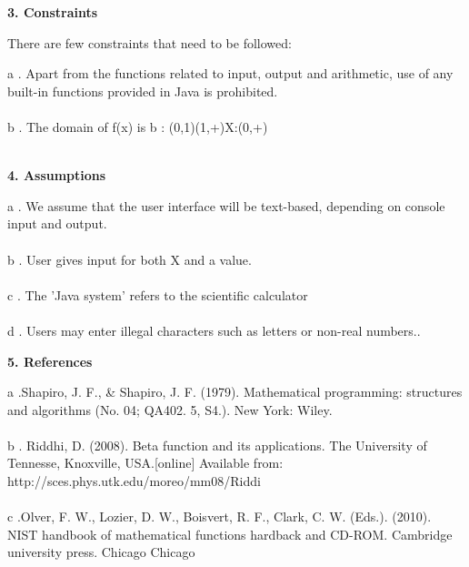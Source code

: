 \documentclass[12pt,letterpaper]{article}
\begin{document}
	\begin{flushleft}
		\large\textbf{3. Constraints}
	\end{flushleft}
    There are few constraints that need to be followed:
		
		\begin{itemize}
			{a .} Apart from the functions related to input, output and arithmetic, use of any built-in functions provided in Java is prohibited. \\
			\\
			{b .} The domain of f(x) is b : (0,1)\cup(1,+\infty)\quad X:(0,+\infty)\\   
			\\
		\end{itemize}
	\begin{flushleft}
		\large\textbf{4. Assumptions}
	\end{flushleft}
	    \begin{itemize}
			{a .} We assume that the user interface will be text-based, depending on console input and output. \\
			\\
			{b .} User gives input for both X and a value. \\
			\\
			{c .} The 'Java system' refers to the scientific calculator\\
			\\
			{d .} Users may enter illegal characters such as letters or non-real numbers..\\
		\end{itemize}
	
	\begin{flushleft}
		\large\textbf{5. References}
	\end{flushleft}
		\begin{enumerate}
			{a .}Shapiro, J. F., & Shapiro, J. F. (1979). Mathematical programming: structures and algorithms (No. 04; QA402. 5, S4.). New York: Wiley.\\
			\\
			{b .} Riddhi, D. (2008). Beta function and its applications. The University of Tennesse, Knoxville, USA.[online] Available from: http://sces.phys.utk.edu/moreo/mm08/Riddi\\
			\\
			{c .}Olver, F. W., Lozier, D. W., Boisvert, R. F., Clark, C. W. (Eds.). (2010). NIST handbook of mathematical functions hardback and CD-ROM. Cambridge university press.
Chicago	
Chicago	
		\end{enumerate}
\end{document}
